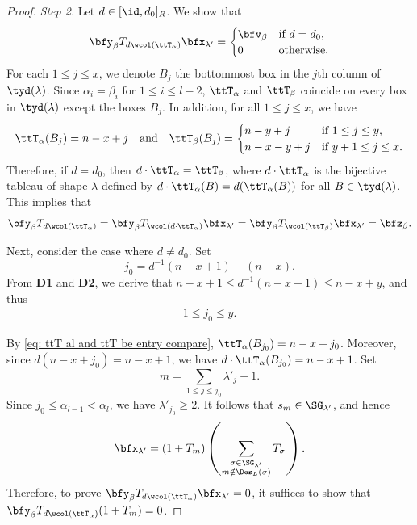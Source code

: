 \documentclass[12pt, reqno]{amsart}
\theoremstyle{plain}
\theoremstyle{definition}
\numberwithin{equation}{section}
\numberwithin{figure}{section}
\numberwithin{table}{section}
\begin{document}
\begin{proof}
{\it Step 2.} Let $d \in [\id, d_0]_R$.
We show that  
\[
\bfy_\beta T_{d \wcol(\ttT_\alpha)} \bfx_{\lambda'} =  
\begin{cases}
   \bfv_\beta  & \text{if $d = d_0$,}\\
   0  & \text{otherwise.}
\end{cases}
\]
For each $1 \leq j \leq x$, we denote $B_j$ the bottommost box in the $j$th column of $\tyd(\lambda)$.
Since $\alpha_i = \beta_i$ for $1 \leq i\leq l-2$, 
$\ttT_{\alpha}$ and $\ttT_{\beta}$ coincide on every box in $\tyd(\lambda)$ except the boxes $B_j$.
In addition, for all $1 \leq j \leq x$, we have
\begin{align}\label{eq: ttT al and ttT be entry compare}
\ttT_{\alpha}(B_j) = n-x+j 
\quad\text{and} \quad
\ttT_{\beta}(B_j) = 
\begin{cases}
    n-y+j & \text{if $1 \leq j \leq y$,}\\
    n-x-y+j & \text{if $y+1 \leq j\leq x$}.
\end{cases}
\end{align}
Therefore, if $d = d_0$, then $d \cdot \ttT_{\alpha} = \ttT_{\beta}$, where $d \cdot \ttT_{\alpha}$ is the bijective tableau of shape $\lambda$ defined by $d \cdot \ttT_{\alpha}(B) = d(\ttT_{\alpha}(B))$ for all $B \in \tyd(\lambda)$.
This implies that
\[
\bfy_{\beta}T_{d \wcol(\ttT_\alpha)} = \bfy_{\beta}T_{ \wcol(d \cdot \ttT_\alpha)}\bfx_{\lambda'} = 
\bfy_{\beta}T_{ \wcol(\ttT_\beta)} \bfx_{\lambda'} = \bfz_{\beta}.
\]

Next, consider the case where $d \neq d_0$.
Set 
\[
j_0 = d^{-1}(n-x+1) - (n - x).
\]
From \textbf{D1} and \textbf{D2}, we derive that $n-x+1 \leq d^{-1}(n-x+1) \leq n-x+y$,
and thus
\begin{align}\label{eq: j0 and y ineq}
1 \le j_0 \le y.
\end{align}



By \cref{eq: ttT al and ttT be entry compare}, $\ttT_{\alpha}(B_{j_0}) = n - x + j_0$.
Moreover, since $d(n-x+j_0) = n-x+1$, we have $d \cdot \ttT_{\alpha}(B_{j_0}) = n - x +1$.
Set 
\[
m = \sum_{1 \leq j\leq j_0}\lambda'_j -1.
\]
Since $j_0 \le \alpha_{l-1} < \alpha_l$, we have $\lambda'_{j_0} \ge 2$.
It follows that $s_m \in \SG_{\lambda'}$, and hence 
\begin{align}\label{eq: x al is decomposed as sm and other sum}
\bfx_{\lambda'} = 
(1+T_m) \left(\sum_{\substack{\sigma \in \SG_{\lambda'} \\ m \notin \Des_L(\sigma)}}T_\sigma\right).
\end{align}
Therefore, to prove $\bfy_{\beta} T_{d \wcol(\ttT_\alpha)} \bfx_{\lambda'} = 0$, it suffices to show that $\bfy_{\beta} T_{d \wcol(\ttT_\alpha)}(1+T_m) = 0$.




\end{proof}
\end{document}
